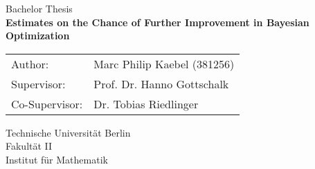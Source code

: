 \begin{titlepage}
    \begin{center}
        \vspace*{3cm}
        \Large
        Bachelor Thesis\\
        \vspace{0.6cm} 
        \LARGE
        \textbf{Estimates on the Chance of Further Improvement in Bayesian Optimization}\\
        \vspace{5cm}
        \large
        \begin{tabular}{ll}
        Author: & Marc Philip Kaebel (381256) \\
        Supervisor: & Prof. Dr. Hanno Gottschalk \\
        Co-Supervisor: & Dr. Tobias Riedlinger \\
        \end{tabular}
        
        \vspace{0.6cm}     
        Technische Universität Berlin \\
        Fakultät II \\
        Institut für Mathematik \\
        \vfill    
        \the\year{}
    \end{center}
 \end{titlepage}